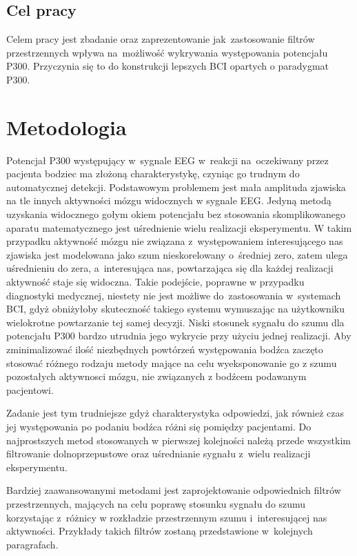 \documentclass[licencjacka,openright]{pracamgr}
\begin{document}
\section{Cel pracy}

Celem pracy jest zbadanie oraz zaprezentowanie jak~zastosowanie filtrów przestrzennych wpływa na~możliwość wykrywania występowania potencjału P300. Przyczynia się to do konstrukcji lepszych BCI opartych o paradygmat P300.



\chapter{Metodologia}
Potencjał P300 występujący w~sygnale EEG w~reakcji na~oczekiwany przez pacjenta bodziec ma złożoną charakterystykę, czyniąc go trudnym do automatycznej detekcji. Podstawowym problemem jest mała amplituda zjawiska na tle innych aktywności mózgu widocznych w sygnale EEG. Jedyną metodą uzyskania widocznego gołym okiem potencjału bez stosowania skomplikowanego aparatu matematycznego jest uśrednienie wielu realizacji eksperymentu. W takim przypadku aktywność mózgu nie związana z~występowaniem interesującego nas zjawiska jest modelowana jako szum nieskorelowany o~średniej zero, zatem ulega uśrednieniu do zera, a~interesująca nas, powtarzająca się dla każdej realizacji aktywność staje się widoczna. Takie podejście, poprawne w przypadku diagnostyki medycznej, niestety nie jest możliwe do~zastosowania w~systemach BCI, gdyż obniżyłoby skuteczność takiego systemu wymuszając na użytkowniku wielokrotne powtarzanie tej samej decyzji. Niski stosunek sygnału do szumu dla potencjału P300 bardzo utrudnia jego wykrycie przy użyciu jednej realizacji. Aby zminimalizować ilość niezbędnych powtórzeń występowania bodźca zaczęto stosować różnego rodzaju metody mające na celu wyeksponowanie go z szumu pozostałych aktywnosci mózgu, nie związanych z bodźcem podawanym pacjentowi.

Zadanie jest tym trudniejsze gdyż charakterystyka odpowiedzi, jak również czas jej występowania po podaniu bodźca różni się pomiędzy pacjentami. Do najprostszych metod stosowanych w pierwszej kolejności należą przede wszystkim filtrowanie dolnoprzepustowe oraz uśrednianie sygnału z~wielu realizacji eksperymentu.

Bardziej zaawansowanymi metodami jest zaprojektowanie odpowiednich filtrów przestrzennych, mających na celu poprawę stosunku sygnału do szumu korzystając z~różnicy w rozkładzie przestrzennym szumu i~interesującej nas aktywności. Przykłady takich filtrów zostaną przedstawione w~kolejnych paragrafach.
\end{document}
